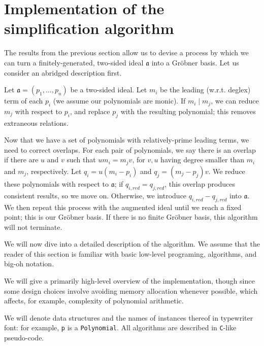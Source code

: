 \section{Implementation of the simplification algorithm}
\label{sec:implementation}

The results from the previous section allow us to devise a process by which we can
turn a finitely-generated, two-sided ideal $\mathfrak{a}$ into a Gr\"obner basis.
Let us consider an abridged description first.

\begin{alg}
    Let $\mathfrak{a} = (p_1,\ldots,p_n)$ be a two-sided ideal. Let $m_i$ be the 
    leading (w.r.t. deglex) term of each $p_i$ (we assume our polynomials are monic).
    If $m_i \mid m_j$, we can reduce $m_j$ with respect to $p_i$, and replace $p_j$
    with the resulting polynomial; this removes extraneous relations.
    
    Now that we have a set of polynomials with relatively-prime leading terms, we need
    to correct overlaps. For each pair of polynomials, we say there is an overlap 
    if there are $u$ and $v$ such that $um_i = m_j v$, for $v, u$ having degree smaller 
    than $m_i$ and $m_j$, respectively. Let $q_i = u(m_i - p_i)$ and $q_j = (m_j - p_j)v$.
    We reduce these polynomials with respect to $\mathfrak{a}$; if $q_{i,red} = q_{j,red}$,
    this overlap produces consistent results, so we move on. Otherwise, we introduce
    $q_{i,red} - q_{j,red}$ into $\mathfrak{a}$. We then repeat this process with the
    augmented ideal until we reach a fixed point; this is our Gr\"obner basis. If
    there is no finite Gr\"obner basis, this algorithm will not terminate.
\end{alg}

We will now dive into a detailed description of the algorithm. We assume that the
reader of this section is familiar with basic low-level programing, algorithms, and
big-oh notation.

\begin{rem}
    We will give a primarily high-level overview of the implementation, though since some
    design choices involve avoiding memory allocation whenever possible, which
    affects, for example, complexity of polynomial arithmetic. 
    
    We will denote data structures and the names of instances thereof in typewriter font:
    for example, \verb|p| is a \verb|Polynomial|. All algorithms are described in
    \verb|C|-like pseudo-code.
\end{rem}

